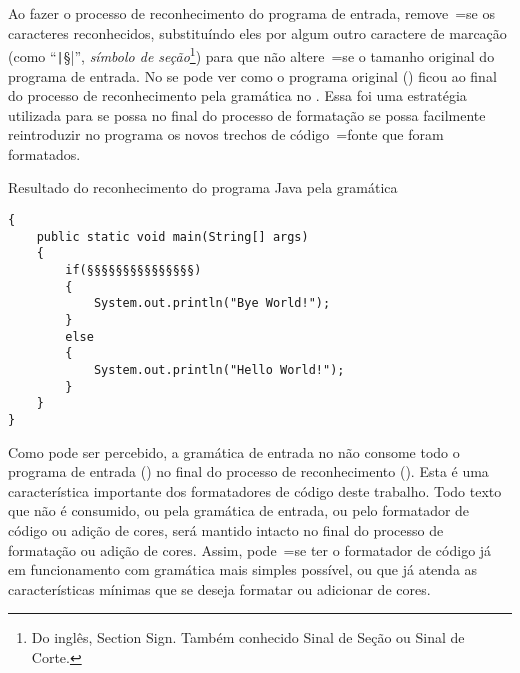 Ao fazer o processo de reconhecimento do programa de entrada,
remove~=se os caracteres reconhecidos,
substituíndo eles por algum outro caractere de marcação (como ``\texttt|§|'',
\textit{símbolo de seção}\footnote{%
Do inglês,
Section Sign.
Também conhecido Sinal de Seção ou
Sinal de Corte.
}) para que não altere~=se o tamanho original do programa de entrada.
No  se pode ver como o programa original () ficou ao final do processo de reconhecimento pela gramática no .
Essa foi uma estratégia utilizada para se possa no final do processo de formatação se possa facilmente reintroduzir no programa os novos trechos de código~=fonte que foram formatados.
\begin{code}
\caption{Resultado do reconhecimento do programa Java pela gramática}
\label{code:resultadoDoReconhecimentoDoProgramaJava}
\begin{verbatim}
{
    public static void main(String[] args)
    {
        if(§§§§§§§§§§§§§§§)
        {
            System.out.println("Bye World!");
        }
        else
        {
            System.out.println("Hello World!");
        }
    }
}
\end{verbatim}
\end{code}

Como pode ser percebido,
a gramática de entrada no  não consome todo o programa de entrada () no final do processo de reconhecimento ().
Esta é uma característica importante dos formatadores de código deste trabalho.
Todo texto que não é consumido,
ou pela gramática de entrada,
ou pelo formatador de código ou
adição de cores,
será mantido intacto no final do processo de formatação ou
adição de cores.
Assim,
pode~=se ter o formatador de código já em funcionamento com gramática mais simples possível,
ou que já atenda as características mínimas que se deseja formatar ou
adicionar de cores.

